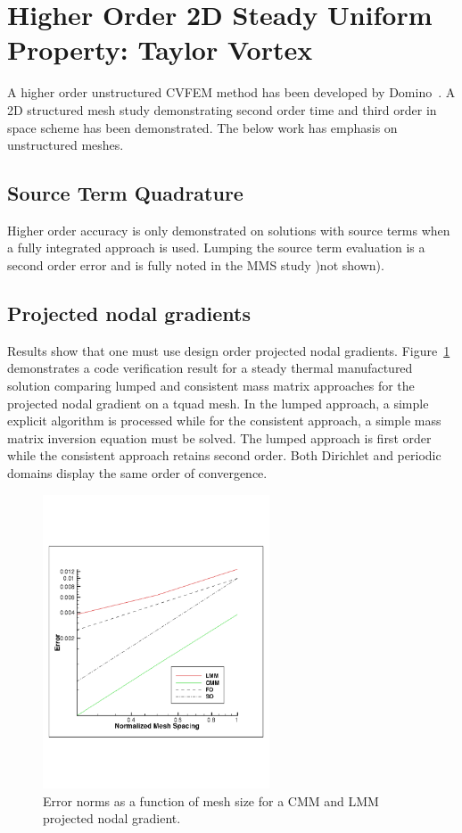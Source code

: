 \section{Higher Order 2D Steady Uniform Property: Taylor Vortex}

A higher order unstructured CVFEM method has been developed by Domino~\cite{Domino:2014}. 
A 2D structured mesh study demonstrating second order time and third order in space scheme 
has been demonstrated. The below work has emphasis on unstructured meshes.

\subsection{Source Term Quadrature}
Higher order accuracy is only demonstrated on solutions with source terms when a fully integrated
approach is used. Lumping the source term evaluation is a second order error and is fully noted in
the MMS study )not shown).

\subsection{Projected nodal gradients}
Results show that one must use design order projected nodal gradients. Figure~\ref{fig:pngTempMMS} demonstrates 
a code verification result for a steady thermal manufactured solution comparing lumped and consistent mass
matrix approaches for the projected nodal gradient on a tquad mesh. In the lumped approach, a simple 
explicit algorithm is processed while for the consistent approach, a simple mass matrix inversion equation 
must be solved. The lumped approach is first order while the consistent approach retains second order. Both
Dirichlet and periodic domains display the same order of convergence.

\begin{figure}
\centerline{\includegraphics[width=0.6\textwidth]{figures/ho_heatCondMMM_dtdx.pdf}}
\caption{Error norms as a function of mesh size for a CMM and LMM projected nodal gradient.}
\label{fig:pngTempMMS}
\end{figure}

